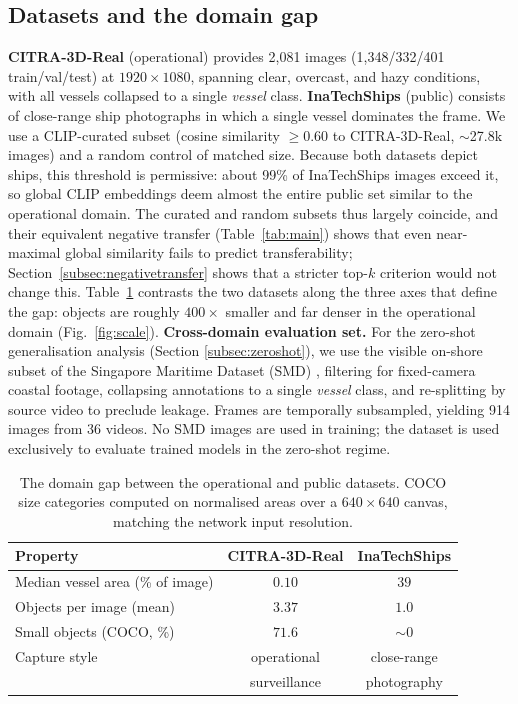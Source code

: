 \documentclass[10pt,conference]{IEEEtran}
\begin{document}
\subsection{Datasets and the domain gap}
\textbf{CITRA-3D-Real} (operational) provides 2{,}081 images
(1{,}348/332/401 train/val/test) at $1920\times1080$, spanning clear, overcast,
and hazy conditions, with all vessels collapsed to a single \emph{vessel} class.
%
\textbf{InaTechShips} \cite{teixeira2025inatechships} (public) consists of
close-range ship photographs in which a single vessel dominates the frame. We use
a CLIP-curated subset (cosine similarity $\ge 0.60$ to CITRA-3D-Real,
$\sim$27.8k images) and a random control of matched size. Because both datasets depict ships, this threshold is permissive: about 99\% of InaTechShips images exceed it, so global CLIP embeddings deem almost the entire public set similar to the operational domain. The curated and random subsets thus largely coincide, and their equivalent negative transfer (Table~\ref{tab:main}) shows that even near-maximal global similarity fails to predict transferability; Section~\ref{subsec:negativetransfer} shows that a stricter top-$k$ criterion would not change this. Table~\ref{tab:gap}
contrasts the two datasets along the three axes that define the gap: objects are
roughly $400\times$ smaller and far denser in the operational domain (Fig.~\ref{fig:scale}).
%
\textbf{Cross-domain evaluation set.} For the zero-shot generalisation analysis (Section \ref{subsec:zeroshot}), we use the visible on-shore subset of the Singapore Maritime Dataset (SMD) \cite{prasad2017video}, filtering for fixed-camera coastal footage, collapsing annotations to a single \emph{vessel} class, and re-splitting by source video to preclude leakage. Frames are temporally subsampled, yielding 914 images from 36 videos. No SMD images are used in training; the dataset is used exclusively to evaluate trained models in the zero-shot regime.

\begin{table}[!t]
\renewcommand{\arraystretch}{1.05}
\caption{The domain gap between the operational and public datasets. COCO size
categories computed on normalised areas over a $640\times640$ canvas, matching
the network input resolution.}
\label{tab:gap}
\centering
\footnotesize
\setlength{\tabcolsep}{4pt}
\begin{tabular}{@{}lcc@{}}
\toprule
Property & CITRA-3D-Real & InaTechShips \\
\midrule
Median vessel area (\% of image) & $0.10$ & $39$ \\
Objects per image (mean)         & $3.37$ & $1.0$ \\
Small objects (COCO, \%)         & $71.6$ & $\sim 0$ \\
Capture style                    & operational & close-range \\
                                 & surveillance & photography \\
\bottomrule
\end{tabular}
\end{table}
\end{document}
